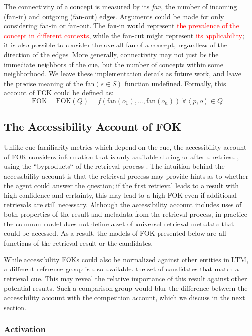 \documentclass[10pt,letterpaper]{article}
\newcommand{\fixme}[2][]{#2}
\renewcommand{\fixme}[2][]{\textcolor{red}{#2}}
\newcommand{\tuple}[1]{\left \langle #1 \right \rangle }
\newcommand{\fok}[0]{\text{FOK}}
\begin{document}
The connectivity of a concept is measured by its \textit{fan}, the number of incoming (fan-in) and outgoing (fan-out) edges.
Arguments could be made for only considering fan-in or fan-out.
The fan-in would represent \fixme{the prevalence of the concept in different contexts}, while the fan-out might represent \fixme{its applicability}; it is also possible to consider the overall fan of a concept, regardless of the direction of the edges.
More generally, connectivity may not just be the immediate neighbors of the cue, but the number of concepts within some neighborhood.
We leave these implementation details as future work, and leave the precise meaning of the $\text{fan}(s{\in}S)$ function undefined.
Formally, this account of FOK could be defined as:
$$\fok = \fok(Q) = f\left(\text{fan}(o_1), ..., \text{fan}(o_n)\right) \; \forall {\tuple{p, o}{\in}Q}$$

\subsection{The Accessibility Account of FOK}

Unlike cue familiarity metrics which depend on the cue, the accessibility account of FOK considers information that is only available during or after a retrieval, using the ``byproducts`` of the retrieval process \cite{Koriat1993HowDoWe}.
The intuition behind the accessibility account is that the retrieval process may provide hints as to whether the agent could answer the question; if the first retrieval leads to a result with high confidence and certainty, this may lead to a high FOK even if additional retrievals are still necessary.
Although the accessibility account includes uses of both properties of the result and metadata from the retrieval process, in practice the common model does not define a set of universal retrieval metadata that could be accessed.
As a result, the models of FOK presented below are all functions of the retrieval result or the candidates.

While accessibility FOKs could also be normalized against other entities in LTM, a different reference group is also available: the set of candidates that match a retrieval cue.
This may reveal the relative importance of this result against other potential results.
Such a comparison group would blur the difference between the accessibility account with the competition account, which we discuss in the next section.

\subsubsection{Activation}
\end{document}
